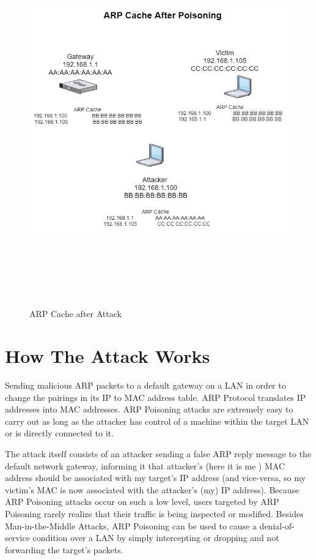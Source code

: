 \documentclass{article}
\begin{document}
\begin{figure}[bp!]
\centering
\includegraphics[width=\textwidth,height=16cm]{images/ARP_Cache_After_Poisoning.png}
\captioig ARP Cache after Attack 
\end{figure}


\section{How The Attack Works}

Sending malicious ARP packets to a default gateway on a LAN in order to change the pairings in its IP to MAC address table. ARP Protocol translates IP addresses into MAC addresses.  ARP Poisoning attacks are extremely easy to carry out as long as the attacker has control of a machine within the target LAN or is directly connected to it.

The attack itself consists of an attacker sending a false ARP reply message to the default network gateway, informing it that attacker's (here it is me ) MAC address should be associated with my target's IP address (and vice-versa, so my victim's  MAC is now associated with the attacker's (my) IP address).
Because ARP Poisoning attacks occur on such a low level, users targeted by ARP Poisoning rarely realize that their traffic is being inspected or modified. Besides Man-in-the-Middle Attacks, ARP Poisoning can be used to cause a denial-of-service condition over a LAN by simply intercepting or dropping and not forwarding the target's packets.
\end{document}
